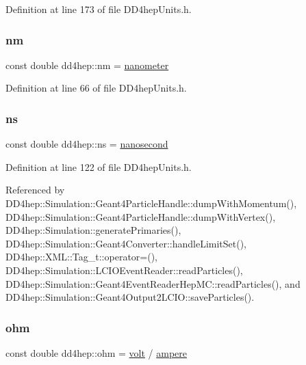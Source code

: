 Definition at line 173 of file D\+D4hep\+Units.\+h.

\hypertarget{namespacedd4hep_a4d2ce915ee05dfc3b7b1c503561e87f1}{}\label{namespacedd4hep_a4d2ce915ee05dfc3b7b1c503561e87f1} 
\subsubsection{\texorpdfstring{nm}{nm}}
{\footnotesize\ttfamily const double dd4hep\+::nm = \hyperlink{namespacedd4hep_af784647fab76654e26b09a341d3f9210}{nanometer}\hspace{0.3cm}{\ttfamily [static]}}



Definition at line 66 of file D\+D4hep\+Units.\+h.

\hypertarget{namespacedd4hep_af8ce9b988119cb2c9b6b7397dbb34e97}{}\label{namespacedd4hep_af8ce9b988119cb2c9b6b7397dbb34e97} 
\subsubsection{\texorpdfstring{ns}{ns}}
{\footnotesize\ttfamily const double dd4hep\+::ns = \hyperlink{namespacedd4hep_acd3d49e76b85c03111a8bdcaffe4c8c7}{nanosecond}\hspace{0.3cm}{\ttfamily [static]}}



Definition at line 122 of file D\+D4hep\+Units.\+h.



Referenced by D\+D4hep\+::\+Simulation\+::\+Geant4\+Particle\+Handle\+::dump\+With\+Momentum(), D\+D4hep\+::\+Simulation\+::\+Geant4\+Particle\+Handle\+::dump\+With\+Vertex(), D\+D4hep\+::\+Simulation\+::generate\+Primaries(), D\+D4hep\+::\+Simulation\+::\+Geant4\+Converter\+::handle\+Limit\+Set(), D\+D4hep\+::\+X\+M\+L\+::\+Tag\+\_\+t\+::operator=(), D\+D4hep\+::\+Simulation\+::\+L\+C\+I\+O\+Event\+Reader\+::read\+Particles(), D\+D4hep\+::\+Simulation\+::\+Geant4\+Event\+Reader\+Hep\+M\+C\+::read\+Particles(), and D\+D4hep\+::\+Simulation\+::\+Geant4\+Output2\+L\+C\+I\+O\+::save\+Particles().

\hypertarget{namespacedd4hep_a4a6ac9823f6701bcc4c42d5221f272b6}{}\label{namespacedd4hep_a4a6ac9823f6701bcc4c42d5221f272b6} 
\subsubsection{\texorpdfstring{ohm}{ohm}}
{\footnotesize\ttfamily const double dd4hep\+::ohm = \hyperlink{namespacedd4hep_a1bbac6ed4a69b41427c9a44a513e2500}{volt} / \hyperlink{namespacedd4hep_a1342ab2280c2fed87fe4beaebae8cf52}{ampere}\hspace{0.3cm}{\ttfamily [static]}}



